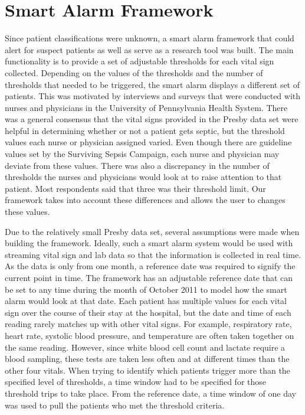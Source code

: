 \documentclass{sig-alternate}
\begin{document}
\vspace{10pt}
\section{Smart Alarm Framework}
\vspace{10pt}
\label{sec:framework}

Since patient classifications were unknown, a smart alarm framework that could alert for suspect patients as well as serve as a research tool was built.  The main functionality is to provide a set of adjustable thresholds for each vital sign collected.  Depending on the values of the thresholds and the number of thresholds that needed to be triggered, the smart alarm displays a different set of patients.  This was motivated by interviews and surveys that were conducted with nurses and physicians in the University of Pennsylvania Health System.  There was a general consensus that the vital signs provided in the Presby data set were helpful in determining whether or not a patient gets septic, but the threshold values each nurse or physician assigned varied.  Even though there are guideline values set by the Surviving Sepsis Campaign, each nurse and physician may deviate from these values.  There was also a discrepancy in the number of thresholds the nurses and physicians would look at to raise attention to that patient.  Most respondents said that three was their threshold limit.  Our framework takes into account these differences and allows the user to changes these values.

Due to the relatively small Presby data set, several assumptions were made when building the framework.  Ideally, such a smart alarm system would be used with streaming vital sign and lab data so that the information is collected in real time.  As the data is only from one month, a reference date was required to signify the current point in time.  The framework has an adjustable reference date that can be set to any time during the month of October 2011 to model how the smart alarm would look at that date.  Each patient has multiple values for each vital sign over the course of their stay at the hospital, but the date and time of each reading rarely matches up with other vital signs.  For example, respiratory rate, heart rate, systolic blood pressure, and temperature are often taken together on the same reading.  However, since white blood cell count and lactate require a blood sampling, these tests are taken less often and at different times than the other four vitals.  When trying to identify which patients trigger more than the specified level of thresholds, a time window had to be specified for those threshold trips to take place.  From the reference date, a time window of one day was used to pull the patients who met the threshold criteria.  
\end{document}
